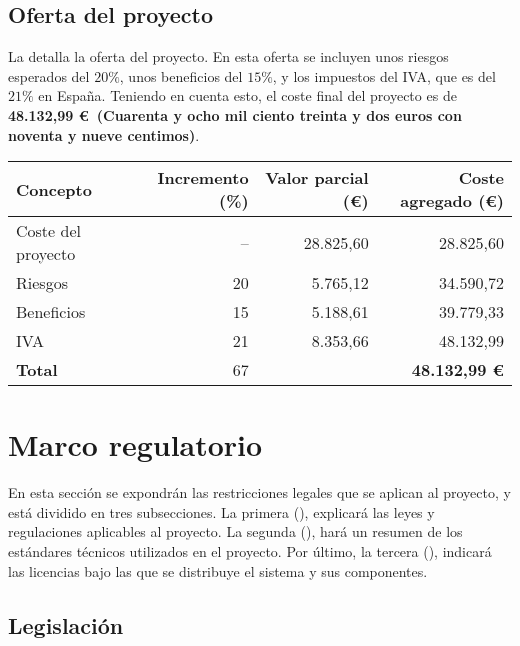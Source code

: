 \subsection{Oferta del proyecto}\label{subsec:offer}

La  detalla la oferta del proyecto. En esta oferta se
incluyen unos riesgos esperados del $20 \%$, unos beneficios del $15 \%$, y los
impuestos del IVA, que es del $21 \%$ en España. Teniendo en cuenta esto, el
coste final del proyecto es de \textbf{48.132,99 \euro~(Cuarenta y ocho mil
ciento treinta y dos euros con noventa y nueve centimos)}.

\begin{table}[htb]
    {
      \begin{tabular}{lrrr}
        \toprule
        \textbf{Concepto} & \textbf{Incremento (\%)} & \textbf{Valor parcial (\euro)} & \textbf{Coste agregado (\euro)} \\
        \midrule
        Coste del proyecto & -- & 28.825,60 & 28.825,60 \\
        Riesgos            & 20 &  5.765,12 & 34.590,72 \\
        Beneficios         & 15 &  5.188,61 & 39.779,33 \\
        IVA                & 21 &  8.353,66 & 48.132,99 \\
        \midrule
        \textbf{Total}     & 67 &           & \textbf{48.132,99 \euro} \\
        \bottomrule
      \end{tabular}
    }
\end{table}

\section{Marco regulatorio}\label{sec:regulation}

En esta sección se expondrán las restricciones legales que se aplican al
proyecto, y está dividido en tres subsecciones. La primera
(), explicará las leyes y regulaciones aplicables al
proyecto. La segunda (), hará un resumen de los
estándares técnicos utilizados en el proyecto. Por último, la tercera
(), indicará las licencias bajo las que se distribuye el
sistema y sus componentes.

\subsection{Legislación}\label{subsec:legislation}

